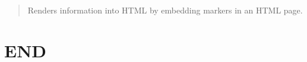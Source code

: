 \documentclass[11pt,twoside,landscape]{article}
\begin{document}
\begin{multicols}{3}
\begin{quote}
Renders information into HTML by embedding markers in an HTML page.
\end{quote}
\section{END}
\label{sec:org08e3363}
\end{multicols}
\end{document}
